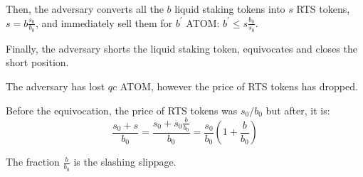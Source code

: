 Then, the adversary converts all the $b$ liquid staking tokens into
$s$ RTS tokens, $s = b \frac{s_0}{b_0}$, and immediately sell them for
$b^{'}$ ATOM: $b^{'} \leq s \frac{b_0}{s_0}$.

Finally, the adversary shorts the liquid staking token, equivocates
and closes the short position.

The adversary has lost $qc$ ATOM, however the price of RTS
tokens has dropped.

Before the equivocation, the price of RTS tokens was $s_0/b_0$ but
after, it is:
\[
\frac{s_0 + s}{b_0} =
\frac{s_0 + s_0\frac{b}{b_0}}{b_0} =
\frac{s_0}{b_0} (1 + \frac{b}{b_0})
\]

The fraction $\frac{b}{b_0}$ is the slashing slippage.

